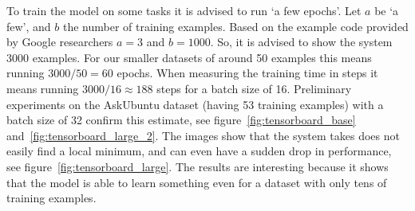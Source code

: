 To train the model on some tasks it is advised to run `a few epochs'.
Let $a$ be `a few', and $b$ the number of training examples.
Based on the example code provided by Google researchers $a = 3$ and $b = 1000$.
So, it is advised to show the system $3000$ examples.
For our smaller datasets of around 50 examples this means running $3000 / 50 = 60$ epochs.
When measuring the training time in steps it means running $3000 / 16 \approx 188$ steps for a batch size of 16.
Preliminary experiments on the AskUbuntu dataset (having 53 training examples) with a batch size of 32 confirm this estimate, see figure~\ref{fig:tensorboard_base} and~\ref{fig:tensorboard_large_2}.
The images show that the system takes does not easily find a local minimum, and can even have a sudden drop in performance, see figure~\ref{fig:tensorboard_large}.
The results are interesting because it shows that the model is able to learn something even for a dataset with only tens of training examples.
